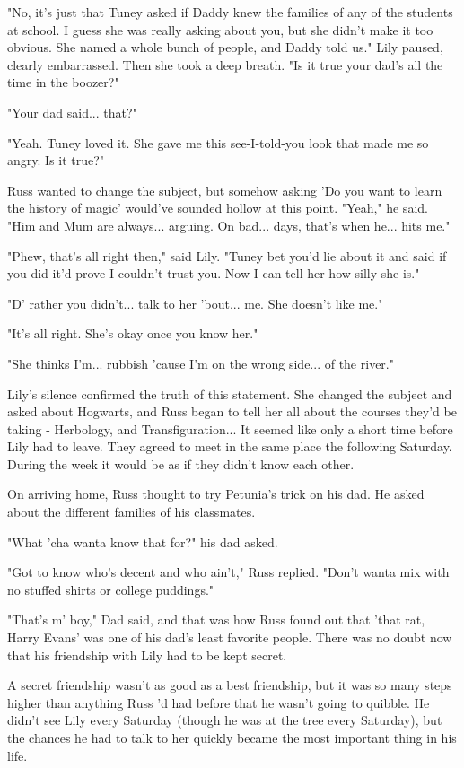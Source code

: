 \documentclass[a4paper,11pt]{article}
\begin{document}
"No, it's just that Tuney asked if Daddy knew the families of any of the students at school. I guess she was really asking about you, but she didn't make it too obvious. She named a whole bunch of people, and Daddy told us." Lily paused, clearly embarrassed. Then she took a deep breath. "Is it true your dad's all the time in the boozer?"

"Your dad said... that?"

"Yeah. Tuney loved it. She gave me this see-I-told-you look that made me so angry. Is it true?"

Russ wanted to change the subject, but somehow asking 'Do you want to learn the history of magic' would've sounded hollow at this point. "Yeah," he said. "Him and Mum are always... arguing. On bad... days, that's when he... hits me."

"Phew, that's all right then," said Lily. "Tuney bet you'd lie about it and said if you did it'd prove I couldn't trust you. Now I can tell her how silly she is."

"D' rather you didn't... talk to her 'bout... me. She doesn't like me."

"It's all right. She's okay once you know her."

"She thinks I'm... rubbish 'cause I'm on the wrong side... of the river."

Lily's silence confirmed the truth of this statement. She changed the subject and asked about Hogwarts, and Russ began to tell her all about the courses they'd be taking - Herbology, and Transfiguration... It seemed like only a short time before Lily had to leave. They agreed to meet in the same place the following Saturday. During the week it would be as if they didn't know each other.

On arriving home, Russ thought to try Petunia's trick on his dad. He asked about the different families of his classmates.

"What 'cha wanta know that for?" his dad asked.

"Got to know who's decent and who ain't," Russ replied. "Don't wanta mix with no stuffed shirts or college puddings."

"That's m' boy," Dad said, and that was how Russ found out that 'that rat, Harry Evans' was one of his dad's least favorite people. There was no doubt now that his friendship with Lily had to be kept secret.

A secret friendship wasn't as good as a best friendship, but it was so many steps higher than anything Russ 'd had before that he wasn't going to quibble. He didn't see Lily every Saturday (though he was at the tree every Saturday), but the chances he had to talk to her quickly became the most important thing in his life.
\end{document}
